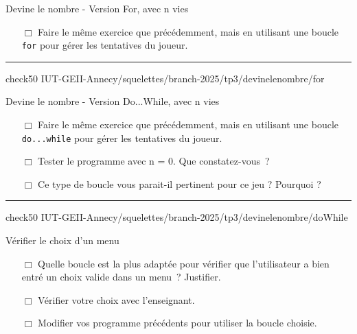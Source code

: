 \begin{UPSTIManipulation}{Devine le nombre - Version For, avec n vies}
	\begin{itemize}
		\item[$\Box$] Faire le même exercice que précédemment, mais en utilisant une boucle \texttt{for} pour gérer les tentatives du joueur.
	\end{itemize}
	\hrule
	check50 IUT-GEII-Annecy/squelettes/branch-2025/tp3/devinelenombre/for
\end{UPSTIManipulation}

\begin{UPSTIManipulation}{Devine le nombre - Version Do...While, avec n vies}
	\begin{itemize}
		\item[$\Box$] Faire le même exercice que précédemment, mais en utilisant une boucle \texttt{do...while} pour gérer les tentatives du joueur.
		\item[$\Box$] Tester le programme avec n = 0. Que constatez-vous ?
		\item[$\Box$] Ce type de boucle vous parait-il pertinent pour ce jeu ? Pourquoi ?
	\end{itemize}
	\hrule
	check50 IUT-GEII-Annecy/squelettes/branch-2025/tp3/devinelenombre/doWhile
\end{UPSTIManipulation}

\begin{UPSTIManipulation}{Vérifier le choix d'un menu}
	\begin{itemize}
		\item[$\Box$] Quelle boucle est la plus adaptée pour vérifier que l'utilisateur a bien entré un choix valide dans un menu ? Justifier.
		\item[$\Box$] Vérifier votre choix avec l'enseignant.
		\item[$\Box$] Modifier vos programme précédents pour utiliser la boucle choisie.
	\end{itemize}
\end{UPSTIManipulation}